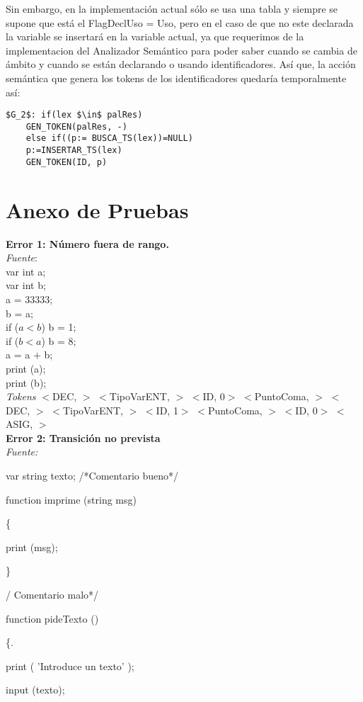 \documentclass[a4paper, 12pt]{article}
\begin{document}
Sin embargo, en la implementación actual sólo se usa una tabla y siempre se supone que está el FlagDeclUso = Uso, pero en el caso de que no este declarada la variable se insertará en la variable actual, ya que requerimos de la implementacion del Analizador Semántico para poder saber cuando se cambia de ámbito y cuando se están declarando o usando identificadores. Así que, la acción semántica que genera los tokens de los identificadores quedaría temporalmente así:
\begin{lstlisting}
$G_2$: if(lex $\in$ palRes)
	GEN_TOKEN(palRes, -)
    else if((p:= BUSCA_TS(lex))=NULL)
	p:=INSERTAR_TS(lex)
	GEN_TOKEN(ID, p)
\end{lstlisting}

\section*{Anexo de Pruebas}

\textbf{Error 1: Número fuera de rango.} \\ 
\emph{Fuente}: \\
var int a; \\
var int b;\\
a = 33333;\\
b = a;\\
 if ($a  <  b$) b  =  1; \\
if ($b  <  a$) b  =  8;\\
 a = a  $+$  b;\\
print (a);\\
print (b);\medskip\\
\emph{Tokens} 
 $<$DEC, $>$ 
 $<$TipoVarENT, $>$ 
 $<$ID, 0$>$ 
 $<$PuntoComa, $>$ 
 $<$DEC, $>$ 
 $<$TipoVarENT, $>$ 
 $<$ID, 1$>$ 
 $<$PuntoComa, $>$ 
 $<$ID, 0$>$ 
 $<$ASIG, $>$ \bigskip \\
\textbf{Error 2: Transición no prevista}\medskip\\
\emph{Fuente:} 


var string texto; /*Comentario bueno*/

 function imprime (string msg)
 
\{

	print (msg);
	
\} 

/ Comentario malo*/

function pideTexto () 

\{. 

	print ( 'Introduce un texto' ); 
	
	input (texto); 
	
\end{document}
